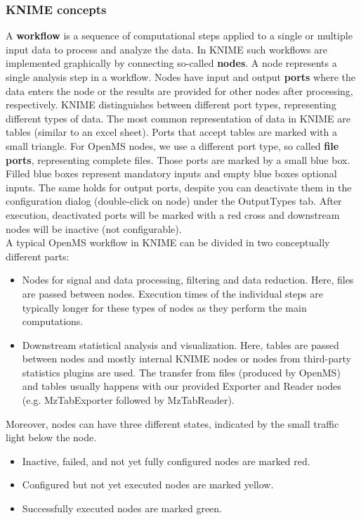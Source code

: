 \subsubsection{KNIME concepts}
\label{KNIME_concepts}

A \textbf{workflow} is a sequence of computational steps applied to a single or multiple input data to process and analyze the data.
In KNIME such workflows are implemented graphically by connecting so-called \textbf{nodes}.
A node represents a single analysis step in a workflow.
Nodes have input and output \textbf{ports} where the data enters the node or the results are provided for other nodes after processing, respectively.
KNIME distinguishes between different port types, representing different types of data.
The most common representation of data in KNIME are tables (similar to an excel sheet).
Ports that accept tables are marked with a small triangle.
For OpenMS nodes, we use a different port type, so called \textbf{file ports}, representing complete files.
Those ports are marked by a small blue box.
Filled blue boxes represent mandatory inputs and empty blue boxes optional inputs. The same holds for output ports, despite you can deactivate them
in the configuration dialog (double-click on node) under the OutputTypes tab. After execution, deactivated ports will be marked with a red cross and downstream nodes
will be inactive (not configurable).\\
A typical OpenMS workflow in KNIME can be divided in two conceptually different parts:
\begin{itemize}
\item
Nodes for signal and data processing, filtering and data reduction. Here, files are passed between nodes. Execution times of the individual steps are typically longer for these types of nodes as they perform the main computations. 
\item
Downstream statistical analysis and visualization. Here, tables are passed between nodes and mostly internal KNIME nodes or nodes from third-party statistics plugins are used. The transfer from files (produced by OpenMS) and tables usually happens with our provided Exporter and Reader nodes (e.g. MzTabExporter followed by MzTabReader).
\end{itemize}
Moreover, nodes can have three different states, indicated by the small traffic light below the node.

\begin{itemize}
\item
Inactive, failed, and not yet fully configured nodes are marked red.
\item
Configured but not yet executed nodes are marked yellow.
\item
Successfully executed nodes are marked green.
\end{itemize}

